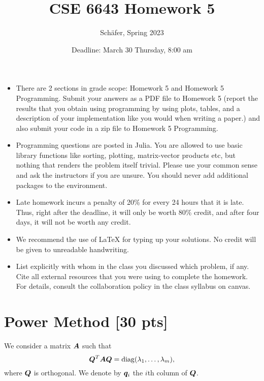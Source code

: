 \documentclass[twoside,10pt]{article}
\begin{document}
\title{CSE 6643 Homework 5}
\author{Sch{\"a}fer, Spring 2023}
\date{Deadline: March 30 Thursday, 8:00 am}
\maketitle

\begin{itemize}
  \item There are 2 sections in grade scope: Homework 5 and Homework 5 Programming. Submit your answers as a PDF file to Homework 5 (report the results that you obtain using programming by using plots, tables, and a description of your implementation like you would when writing a paper.) and also submit your code in a zip file to Homework 5 Programming. 
  \item Programming questions are posted in Julia. You are allowed to use basic library functions like sorting, plotting, matrix-vector products etc, but nothing that renders the problem itself trivial. Please use your common sense and ask the instructors if you are unsure. 
  You should never add additional packages to the environment.
  \item Late homework incurs a penalty of 20\% for every 24 hours that it is late. Thus, right after the deadline, it will only be worth 80\% credit, and after four days, it will not be worth any credit. 
  \item We recommend the use of LaTeX for typing up your solutions. No credit will be given to unreadable handwriting.
  \item List explicitly with whom in the class you discussed which problem, if any. Cite all external resources that you were using to complete the homework. For details, consult the collaboration policy in the class syllabus on canvas.
\end{itemize}


\section{Power Method [30 pts]} 

We consider a matrix $\bm{A}$ such that
\begin{equation} 
  \mtx{Q}^T \mtx{A} \mtx{Q} = \operatorname{diag}\left(\lambda_1, \ldots, \lambda_m\right),
\end{equation}
where $\bm{Q}$ is orthogonal. We denote by $\bm{q}_i$ the $i$th column of $\bm{Q}$. 
\end{document}
